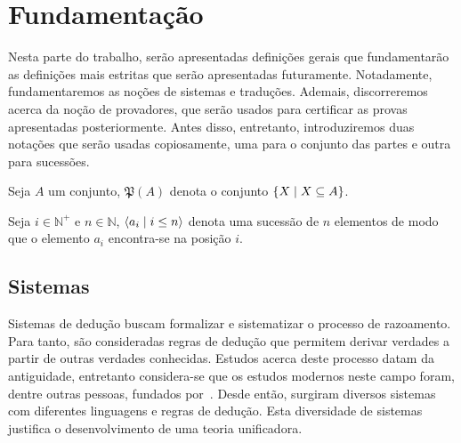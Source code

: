 \chapter{Fundamentação}\label{foundation}

Nesta parte do trabalho, serão apresentadas definições gerais que fundamentarão as definições mais estritas que serão apresentadas futuramente. Notadamente, fundamentaremos as noções de sistemas e traduções. Ademais, discorreremos acerca da noção de provadores, que serão usados para certificar as provas apresentadas posteriormente. Antes disso, entretanto, introduziremos duas notações que serão usadas copiosamente, uma para o conjunto das partes e outra para sucessões.

\vspace{.5\baselineskip}
\begin{tcolorbox}[enhanced jigsaw, breakable, sharp corners, colframe=black, colback=white, boxrule=0.5pt, left=1.5mm, right=1.5mm, top=1.5mm, bottom=1.5mm]
\begin{notation}
    Seja $A$ um conjunto, $\mathfrak{P}(A)$ denota o conjunto $\left\{X\mid X\subseteq A\right\}$.
\end{notation}
\end{tcolorbox}

\begin{tcolorbox}[enhanced jigsaw, breakable, sharp corners, colframe=black, colback=white, boxrule=0.5pt, left=1.5mm, right=1.5mm, top=1.5mm, bottom=1.5mm]
\begin{notation}
    Seja $i\in\mathbb{N}^+$ e $n\in\mathbb{N}$, $\langle a_i\mid i\leq n\rangle$ denota uma sucessão de $n$ elementos de modo que o elemento $a_i$ encontra-se na posição $i$.
\end{notation}
\end{tcolorbox}

\section{Sistemas}\label{foundation.systems}

Sistemas de dedução buscam formalizar e sistematizar o processo de razoamento.
Para tanto, são consideradas regras de dedução que permitem derivar verdades a partir de outras verdades conhecidas.
Estudos acerca deste processo datam da antiguidade, entretanto considera-se que os estudos modernos neste campo foram, dentre outras pessoas, fundados por~\cite{Frege.1967}.
Desde então, surgiram diversos sistemas com diferentes linguagens e regras de dedução.
Esta diversidade de sistemas justifica o desenvolvimento de uma teoria unificadora.

